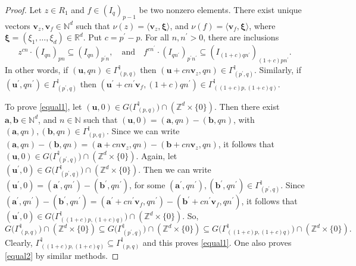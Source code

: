 \documentclass[10pt,a4paper]{amsart}
\begin{document}
\begin{proof}
Let $z\in R_1$ and $f\in {\left(I_{q}\right)}_{p-1}$ be two nonzero elements. There exist unique vectors $\mathbf{v}_z, \mathbf{v}_f \in \mathbb{N}^d$ such that $\nu(z) = \langle \mathbf{v}_z, \boldsymbol{\xi}\rangle$, and $\nu(f) = \langle \mathbf{v}_f, \boldsymbol{\xi}\rangle$, where $\boldsymbol{\xi}=(\xi_1,\ldots,\xi_d)\in \mathbb{R}^d$. Put $c=p^{\prime}-p$. For all $n,n^{\prime}>0$, there are inclusions $$z^{cn}\cdot {\left(I_{qn}\right)}_{pn} \subseteq {\left(I_{qn}\right)}_{p^{\prime}n}, \quad \text{and} \quad f^{cn^{\prime}}\cdot {\left(I_{qn^{\prime}}\right)}_{p^{\prime}n^{\prime}} \subseteq {\left(I_{(1+c)qn^{\prime}}\right)}_{(1+c)pn^{\prime}}.$$ In other words, if $(\mathbf{u},qn)\in \Gamma^{\mathbb{I}}_{(p,q)}$ then $(\mathbf{u}+cn\mathbf{v}_z,qn)\in \Gamma^{\mathbb{I}}_{(p^{\prime},q)}$. Similarly, if $(\mathbf{u}^{\prime},qn^{\prime})\in \Gamma^{\mathbb{I}}_{(p^{\prime},q)}$ then $(\mathbf{u}^{\prime}+cn^{\prime}\mathbf{v}_f,(1+c)qn^{\prime})\in \Gamma^{\mathbb{I}}_{\left((1+c)p,(1+c)q\right)}$.

To prove \eqref{equal1}, let $\left(\mathbf{u},0\right) \in G\big(\Gamma^{\mathbb{I}}_{(p,q)}\big) \cap \left(\mathbb{Z}^d\times \{0\}\right)$. Then there exist $\mathbf{a},\mathbf{b}\in \mathbb{N}^d$, and $n\in\mathbb{N}$ such that $\left(\mathbf{u},0\right) = (\mathbf{a},qn) - (\mathbf{b},qn)$, with $(\mathbf{a},qn), (\mathbf{b},qn) \in \Gamma^{\mathbb{I}}_{(p,q)}$. Since we can write $(\mathbf{a},qn) - (\mathbf{b},qn) = (\mathbf{a}+cn\mathbf{v}_z,qn) - (\mathbf{b}+cn\mathbf{v}_z,qn)$, it follows that $\left(\mathbf{u},0\right) \in G\big(\Gamma^{\mathbb{I}}_{(p^{\prime},q)}\big) \cap \left(\mathbb{Z}^d\times \{0\}\right)$. Again, let $\left(\mathbf{u}^{\prime},0\right) \in G\big(\Gamma^{\mathbb{I}}_{(p^{\prime},q)}\big) \cap \left(\mathbb{Z}^d\times \{0\}\right)$. Then we can write $\left(\mathbf{u}^{\prime},0\right) = (\mathbf{a}^{\prime},qn^{\prime}) - (\mathbf{b}^{\prime},qn^{\prime})$, for some $(\mathbf{a}^{\prime},qn^{\prime}), (\mathbf{b}^{\prime},qn^{\prime}) \in \Gamma^{\mathbb{I}}_{(p^{\prime},q)}$. Since $(\mathbf{a}^{\prime},qn^{\prime}) - (\mathbf{b}^{\prime},qn^{\prime}) = (\mathbf{a}^{\prime}+cn^{\prime}\mathbf{v}_f,qn^{\prime}) - (\mathbf{b}^{\prime}+cn^{\prime}\mathbf{v}_f,qn^{\prime})$, it follows that $\left(\mathbf{u}^{\prime},0\right) \in G\big(\Gamma^{\mathbb{I}}_{((1+c)p,(1+c)q)}\big)\cap \left(\mathbb{Z}^d\times \{0\}\right)$. So, $$G\big(\Gamma^{\mathbb{I}}_{(p,q)}\big) \cap \left(\mathbb{Z}^d\times \{0\}\right) \subseteq G\big(\Gamma^{\mathbb{I}}_{(p^{\prime},q)}\big) \cap \left(\mathbb{Z}^d\times \{0\}\right) \subseteq G\big(\Gamma^{\mathbb{I}}_{((1+c)p,(1+c)q)}\big) \cap \left(\mathbb{Z}^d\times \{0\}\right).$$ Clearly, $\Gamma^{\mathbb{I}}_{((1+c)p,(1+c)q)} \subseteq \Gamma^{\mathbb{I}}_{(p,q)}$ and this proves \eqref{equal1}. One also proves \eqref{equal2} by similar methods.


\end{proof}
\end{document}
